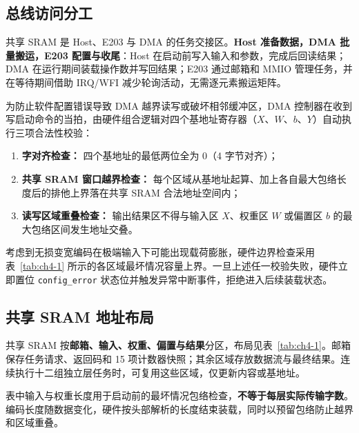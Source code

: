 \documentclass[UTF8,a4paper,zihao=-4,fontset=none,openany,oneside]{ctexrep}
\begin{document}
\subsection{总线访问分工}

共享 SRAM 是 Host、E203 与 DMA 的任务交接区。\textbf{Host 准备数据，DMA 批量搬运，E203 配置与收尾}：Host 在启动前写入输入和参数，完成后回读结果；DMA 在运行期间装载操作数并写回结果；E203 通过邮箱和 MMIO 管理任务，并在等待期间借助 IRQ/\allowbreak{}WFI 减少轮询活动，无需逐元素搬运矩阵。

为防止软件配置错误导致 DMA 越界读写或破坏相邻缓冲区，DMA 控制器在收到写启动命令的当拍，由硬件组合逻辑对四个基地址寄存器（$X$、$W$、$b$、$Y$）自动执行三项合法性校验：
\begin{enumerate}
\item \textbf{字对齐检查：} 四个基地址的最低两位全为 0（4 字节对齐）；
\item \textbf{共享 SRAM 窗口越界检查：} 每个区域从基地址起算、加上各自最大包络长度后的排他上界落在共享 SRAM 合法地址空间内；
\item \textbf{读写区域重叠检查：} 输出结果区不得与输入区 $X$、权重区 $W$ 或偏置区 $b$ 的最大包络区间发生地址交叠。
\end{enumerate}
考虑到无损变宽编码在极端输入下可能出现载荷膨胀，硬件边界检查采用表~\ref{tab:ch4-1} 所示的各区域最坏情况容量上界。一旦上述任一校验失败，硬件立即置位 \texttt{config\_error} 状态位并触发异常中断事件，拒绝进入后续装载状态。

\subsection{共享 SRAM 地址布局}

共享 SRAM 按\textbf{邮箱、输入、权重、偏置与结果}分区，布局见表~\ref{tab:ch4-1}。邮箱保存任务请求、返回码和 15 项计数器快照；其余区域存放数据流与最终结果。连续执行十二组独立层任务时，可复用这些区域，仅更新内容或基地址。

表中输入与权重长度用于启动前的最坏情况包络检查，\textbf{不等于每层实际传输字数}。编码长度随数据变化，硬件按头部解析的长度结束装载，同时以预留包络防止越界和区域重叠。
\end{document}
